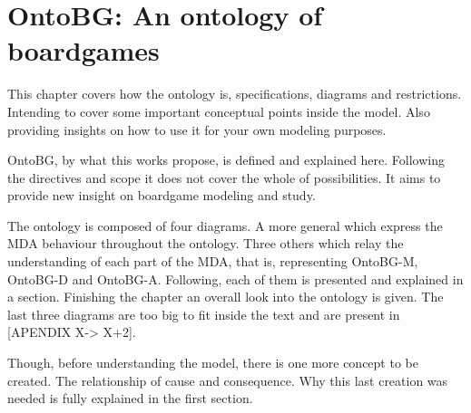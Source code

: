 \chapter{OntoBG: An ontology of boardgames}


This chapter covers how the ontology is, specifications, diagrams and restrictions. Intending to cover some important conceptual points inside the model. Also providing insights on how to use it for your own modeling purposes.

OntoBG, by what this works propose, is defined and explained here. Following the directives and scope it does not cover the whole of possibilities. It aims to provide new insight on boardgame modeling and study. 

The ontology is composed of four diagrams. A more general which express the MDA behaviour throughout the ontology. Three others which relay the understanding of each part of the MDA, that is, representing OntoBG-M, OntoBG-D and OntoBG-A. Following, each of them is presented and explained in a section. Finishing the chapter an overall look into the ontology is given. The last three diagrams are too big to fit inside the text and are present in [APENDIX X-> X+2].

Though, before understanding the model, there is one more concept to be created. The relationship of cause and consequence. Why this last creation was needed is fully explained in the first section.








